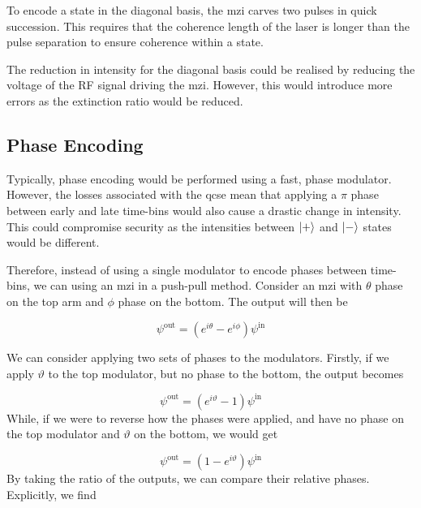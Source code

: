 
To encode a state in the diagonal basis, the \ac{mzi} carves two pulses in quick succession. This requires that the coherence length of the laser is longer than the pulse separation to ensure coherence within a state. 

The reduction in intensity for the diagonal basis could be realised by reducing the voltage of the RF signal driving the \ac{mzi}. However, this would introduce more errors as the extinction ratio would be reduced.

\subsection{Phase Encoding}

Typically, phase encoding would be performed using a fast, phase modulator. However, the losses associated with the \ac{qcse} mean that applying a $\pi$ phase between early and late time-bins would also cause a drastic change in intensity. This could compromise security as the intensities between $\ket{+}$ and $\ket{-}$ states would be different. 

Therefore, instead of using a single modulator to encode phases between time-bins, we can using an \ac{mzi} in a push-pull method. Consider an \ac{mzi} with $\theta$ phase on the top arm and $\phi$ phase on the bottom. The output will then be 

\begin{equation}
	\psi^\mathrm{out} =  \left(e^{i\theta} - e^{i\phi}\right) \psi^\mathrm{in}
\end{equation}

We can consider applying two sets of phases to the modulators. Firstly, if we apply $\vartheta$ to the top modulator, but no phase to the bottom, the output becomes

\begin{equation}
	\psi^\mathrm{out} =  \left(e^{i\vartheta} -1\right) \psi^\mathrm{in}
\end{equation}
While, if we were to reverse how the phases were applied, and have no phase on the top modulator and $\vartheta$ on the bottom, we would get

\begin{equation}
	\psi^\mathrm{out} =  \left(1 - e^{i\vartheta}\right) \psi^\mathrm{in}
\end{equation}
By taking the ratio of the outputs, we can compare their relative phases. Explicitly, we find

